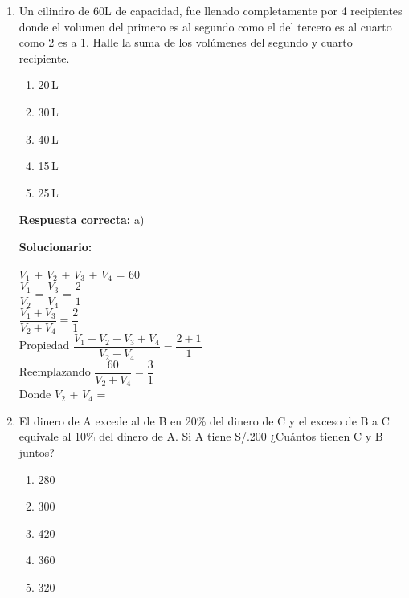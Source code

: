 \begin{enumerate}
	
	\vspace{6mm}
	
	\item Un cilindro de 60L de capacidad, fue llenado completamente por 4 recipientes donde el volumen del primero es al segundo como el del tercero es al cuarto como 2 es a 1. Halle la suma de los volúmenes del segundo y cuarto recipiente.
	\begin{enumerate}[label=\alph*)]
		\item 20\,L
		\item 30\,L
		\item 40\,L
		\item 15\,L
		\item 25\,L
	\end{enumerate}
	
	\textbf{Respuesta correcta:} a)
	
	\vspace{2mm}
	\textbf{Solucionario:}
	
	$V_1$ + $V_2$ + $V_3$ + $V_4$ = 60\\
	
	$\displaystyle\dfrac{V_1}{V_2} = \dfrac{V_3}{V_4} = \dfrac{2}{1}$\\
	
	$\displaystyle\dfrac{V_1+V_3}{V_2+V_4} = \dfrac{2}{1}$\\
	
	Propiedad   $\displaystyle\dfrac{V_1+V_2+V_3+V_4}{V_2+V_4} = \dfrac{2+1}{1}$\\
	
	Reemplazando   $\displaystyle\dfrac{60}{V_2+V_4} = \dfrac{3}{1}$\\
	
	Donde $V_2$ + $V_4$ = 
	
	\vspace{6mm}
	
	\item El dinero de A excede al de B en 20\% del dinero de C y el exceso de B a C equivale al 10\% del dinero de A. Si A tiene S/.200 ¿Cuántos tienen C y B juntos?
	
	
	
	
	\begin{enumerate}[label=\alph*)]
		\item 280
		\item 300
		\item 420
		\item 360
		\item 320
	\end{enumerate}
	

\end{enumerate}
